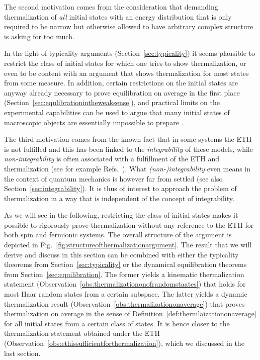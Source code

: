 \documentclass[a4paper,12pt,listof=totoc,index=totoc,bibliography=totoc,headsepline=false,headings=normal,BCOR16.153846mm,DIV12,headinclude,twoside,cleardoublepage=empty,numbers=noenddot,final]{scrreprt}
\theoremstyle{mystyle}
\numberwithin{equation}{section}
\numberwithin{figure}{section}
\numberwithin{lemma}{section}
\numberwithin{theorem}{section}
\numberwithin{corollary}{section}
\numberwithin{definition}{section}
\numberwithin{conjecture}{section}
\numberwithin{observation}{section}
\newcommand{\+}{\mkern2mu}
\DeclareMathOperator{\1}{\mathds{1}}
\begin{document}
The second motivation comes from the consideration that demanding thermalization of \emph{all} initial states with an energy distribution that is only required to be narrow but otherwise allowed to have arbitrary complex structure is asking for too much.

In the light of typicality arguments (Section~\ref{sec:typicality}) it seems plausible to restrict the class of initial states for which one tries to show thermalization, or even to be content with an argument that shows thermalization for most states from some measure.
In addition, certain restrictions on the initial states are anyway already necessary to prove equilibration on average in the first place (Section~\ref{sec:equlibrationintheweaksense}), and practical limits on the experimental capabilities can be used to argue that many initial states of macroscopic objects are essentially impossible to prepare \cite{Reimann12,Reimann2012,Reimann08}.

The third motivation comes from the known fact that in some systems the ETH is not fulfilled and this has been linked to the \emph{integrability} of these models, while \emph{non-integrability} is often associated with a fulfillment of the ETH and thermalization (see for example Refs.~\cite{Rigol07,Rigol08,Rigol11,Larson13,Polkovnikov10,Cassidy11,Gritsev10,Fioretto2010,1006.1634v1,Cazalilla11,1103.0787v1}).
What \emph{\mbox{(non-)}integrability} even means in the context of quantum mechanics is however far from settled \cite{1012.3587v1,Benet2003} (see also Section~\ref{sec:integrability}).
It is thus of interest to approach the problem of thermalization in a way that is independent of the concept of integrability.

As we will see in the following, restricting the class of initial states makes it possible to rigorously prove thermalization without any reference to the ETH for both spin and fermionic systems.
The overall structure of the argument is depicted in Fig.~\ref{fig:structureofthermalizationargument}.
The result that we will derive and discuss in this section can be combined with either the typicality theorems from Section~\ref{sec:typicality} or the dynamical equilibration theorems from Section~\ref{sec:equilibration}.
The former yields a kinematic thermalization statement (Observation~\ref{obs:thermalizationonofrandomstaates}) that holds for most Haar random states from a certain subspace.
The latter yields a dynamic thermalization result (Observation~\ref{obs:thermalizationonaverage}) that proves thermalization on average in the sense of Definition~\ref{def:thermlaizationonaverage} for all initial states from a certain class of states.
It is hence closer to the thermalization statement obtained under the ETH (Observation~\ref{obs:ethissufficientforthermalization}), which we discussed in the last section.
\end{document}
